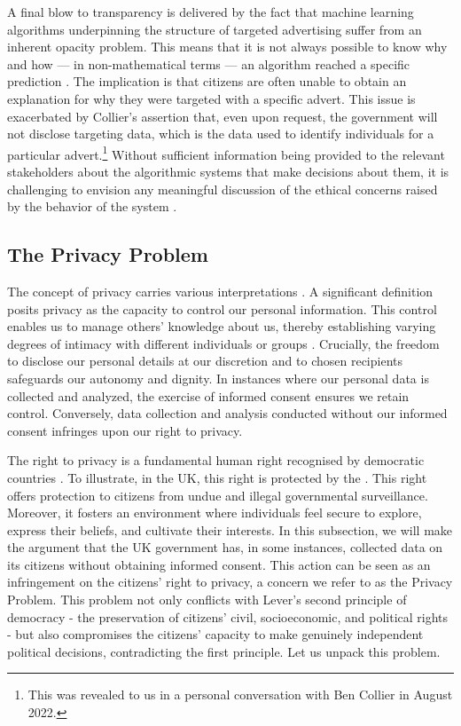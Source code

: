 \documentclass[preprint]{acmart}
\begin{document}
A final blow to transparency is delivered by the fact that machine learning algorithms underpinning the structure of targeted advertising suffer from an inherent opacity problem. This means that it is not always possible to know why and how --- in non-mathematical terms --- an algorithm reached a specific prediction \cite{burrell2016machine,kasirzadeh2021reasons,kasirzadeh2021use,gunther2022algorithmic}. The implication is that citizens are often unable to obtain an explanation for why they were targeted with a specific advert. This issue is exacerbated by Collier's assertion that, even upon request, the government will not disclose targeting data, which is the data used to identify individuals for a particular advert.\footnote{This was revealed to us in a personal conversation with Ben Collier in August 2022.} Without sufficient information being provided to the relevant stakeholders about the algorithmic systems that make decisions about them, it is challenging to envision any meaningful discussion of the ethical concerns raised by the behavior of the system \cite{Diakopoulos2020}.




\subsection{The Privacy Problem}

The concept of privacy carries various interpretations \cite{dwork2006differential,finn2013seven,moore2008defining,liu2021}. A significant definition posits privacy as the capacity to control our personal information. This control enables us to manage others' knowledge about us, thereby establishing varying degrees of intimacy with different individuals or groups \cite{solove2008}. Crucially, the freedom to disclose our personal details at our discretion and to chosen recipients safeguards our autonomy and dignity. In instances where our personal data is collected and analyzed, the exercise of informed consent ensures we retain control. Conversely, data collection and analysis conducted without our informed consent infringes upon our right to privacy.


The right to privacy is a fundamental human right recognised by democratic countries \cite{thomson1975right,cohen2013privacy}. To illustrate, in the UK, this right is protected by the \textit{\citeauthor{humanrights}}. This right offers protection to citizens from undue and illegal governmental surveillance. Moreover, it fosters an environment where individuals feel secure to explore, express their beliefs, and cultivate their interests. In this subsection, we will make the argument that the UK government has, in some instances, collected data on its citizens without obtaining informed consent. This action can be seen as an infringement on the citizens' right to privacy, a concern we refer to as the Privacy Problem. This problem not only conflicts with Lever's second principle of democracy - the preservation of citizens' civil, socioeconomic, and political rights - but also compromises the citizens' capacity to make genuinely independent political decisions, contradicting the first principle. Let us unpack this problem.
\end{document}
